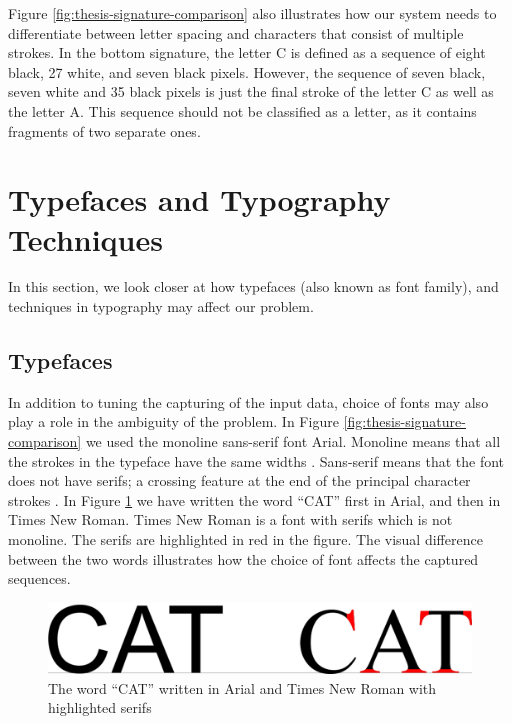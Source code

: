 Figure \ref{fig:thesis-signature-comparison} also illustrates how our system needs to differentiate between letter spacing and characters that consist of multiple strokes. In the bottom signature, the letter C is defined as a sequence of eight black, 27 white, and seven black pixels. However, the sequence of seven black, seven white and 35 black pixels is just the final stroke of the letter C as well as the letter A. This sequence should not be classified as a letter, as it contains fragments of two separate ones.


\section{Typefaces and Typography Techniques}
\label{sec:use_of_fonts}
In this section, we look closer at how typefaces (also known as font family), and techniques in typography may affect our problem.

\subsection{Typefaces}
In addition to tuning the capturing of the input data, choice of fonts may also play a role in the ambiguity of the problem. In Figure \ref{fig:thesis-signature-comparison} we used the monoline sans-serif font Arial. Monoline means that all the strokes in the typeface have the same widths \citep[pp.~315]{felici2011complete}. Sans-serif means that the font does not have serifs; a crossing feature at the end of the principal character strokes \citep[pp.~33--36]{felici2011complete}. In Figure \ref{fig:typeface-comparison} we have written the word ``CAT'' first in Arial, and then in Times New Roman. Times New Roman is a font with serifs which is not monoline. The serifs are highlighted in red in the figure. The visual difference between the two words illustrates how the choice of font affects the captured sequences.

\begin{figure}[h]
    \centering
    \captionsetup{justification=centering}
    \includegraphics[width=1.0\textwidth]{fig/chapter2/typeface_comparison.png}
    \caption{The word ``CAT'' written in Arial and Times New Roman with highlighted serifs}
    \label{fig:typeface-comparison}
\end{figure}

